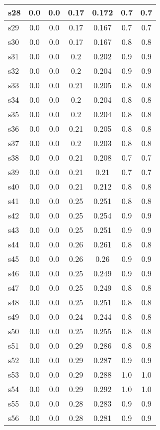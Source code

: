\documentclass{article}
\begin{document}
\begin{tabular}{|l|c|c|c|c|c|c|}
\hline
s28 &0.0 & 0.0 & 0.17 & 0.172 & 0.7 & 0.7\\
\hline
s29 &0.0 & 0.0 & 0.17 & 0.167 & 0.7 & 0.7\\
\hline
s30 &0.0 & 0.0 & 0.17 & 0.167 & 0.8 & 0.8\\
\hline
s31 &0.0 & 0.0 & 0.2 & 0.202 & 0.9 & 0.9\\
\hline
s32 &0.0 & 0.0 & 0.2 & 0.204 & 0.9 & 0.9\\
\hline
s33 &0.0 & 0.0 & 0.21 & 0.205 & 0.8 & 0.8\\
\hline
s34 &0.0 & 0.0 & 0.2 & 0.204 & 0.8 & 0.8\\
\hline
s35 &0.0 & 0.0 & 0.2 & 0.204 & 0.8 & 0.8\\
\hline
s36 &0.0 & 0.0 & 0.21 & 0.205 & 0.8 & 0.8\\
\hline
s37 &0.0 & 0.0 & 0.2 & 0.203 & 0.8 & 0.8\\
\hline
s38 &0.0 & 0.0 & 0.21 & 0.208 & 0.7 & 0.7\\
\hline
s39 &0.0 & 0.0 & 0.21 & 0.21 & 0.7 & 0.7\\
\hline
s40 &0.0 & 0.0 & 0.21 & 0.212 & 0.8 & 0.8\\
\hline
s41 &0.0 & 0.0 & 0.25 & 0.251 & 0.8 & 0.8\\
\hline
s42 &0.0 & 0.0 & 0.25 & 0.254 & 0.9 & 0.9\\
\hline
s43 &0.0 & 0.0 & 0.25 & 0.251 & 0.9 & 0.9\\
\hline
s44 &0.0 & 0.0 & 0.26 & 0.261 & 0.8 & 0.8\\
\hline
s45 &0.0 & 0.0 & 0.26 & 0.26 & 0.9 & 0.9\\
\hline
s46 &0.0 & 0.0 & 0.25 & 0.249 & 0.9 & 0.9\\
\hline
s47 &0.0 & 0.0 & 0.25 & 0.249 & 0.8 & 0.8\\
\hline
s48 &0.0 & 0.0 & 0.25 & 0.251 & 0.8 & 0.8\\
\hline
s49 &0.0 & 0.0 & 0.24 & 0.244 & 0.8 & 0.8\\
\hline
s50 &0.0 & 0.0 & 0.25 & 0.255 & 0.8 & 0.8\\
\hline
s51 &0.0 & 0.0 & 0.29 & 0.286 & 0.8 & 0.8\\
\hline
s52 &0.0 & 0.0 & 0.29 & 0.287 & 0.9 & 0.9\\
\hline
s53 &0.0 & 0.0 & 0.29 & 0.288 & 1.0 & 1.0\\
\hline
s54 &0.0 & 0.0 & 0.29 & 0.292 & 1.0 & 1.0\\
\hline
s55 &0.0 & 0.0 & 0.28 & 0.283 & 0.9 & 0.9\\
\hline
s56 &0.0 & 0.0 & 0.28 & 0.281 & 0.9 & 0.9\\

\end{tabular}
\end{document}
